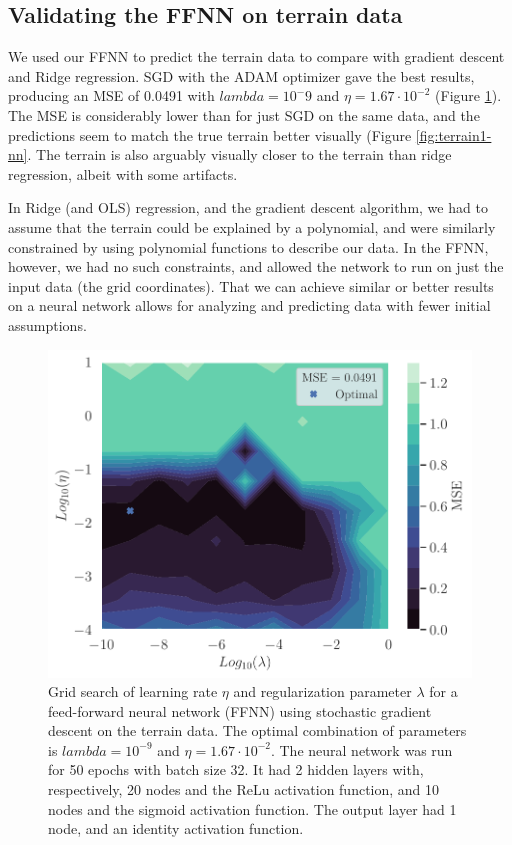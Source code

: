\subsection{Validating the FFNN on terrain data}

We used our FFNN to predict the terrain data to compare with gradient descent and Ridge regression. SGD with the ADAM optimizer gave the best results, producing an MSE of 0.0491 with $lambda=10^-9$ and $\eta=1.67\cdot10^{-2}$ (Figure \ref{fig:nn-terrain-sgd-grid}). The MSE is considerably lower than for just SGD on the same data, and the predictions seem to match the true terrain better visually (Figure \ref{fig:terrain1-nn}. The terrain is also arguably visually closer to the terrain than ridge regression, albeit with some artifacts.

In Ridge (and OLS) regression, and the gradient descent algorithm, we had to assume that the terrain could be explained by a polynomial, and were similarly constrained by using polynomial functions to describe our data. In the FFNN, however, we had no such constraints, and allowed the network to run on just the input data (the grid coordinates). That we can achieve similar or better results on a neural network allows for analyzing and predicting data with fewer initial assumptions.

\begin{figure}
    \centering
    \includegraphics[width=0.99\linewidth]{latex/figures/nn-grid-search-sgd.pdf}
    \caption{Grid search of learning rate $\eta$ and regularization parameter $\lambda$ for a feed-forward neural network (FFNN) using stochastic gradient descent on the terrain data. The optimal combination of parameters is $lambda=10^{-9}$ and $\eta=1.67\cdot10^{-2}$. The neural network was run for 50 epochs with batch size 32. It had 2 hidden layers with, respectively, 20 nodes and the ReLu activation function, and 10 nodes and the sigmoid activation function. The output layer had 1 node, and an identity activation function.}
    \label{fig:nn-terrain-sgd-grid}
\end{figure}

